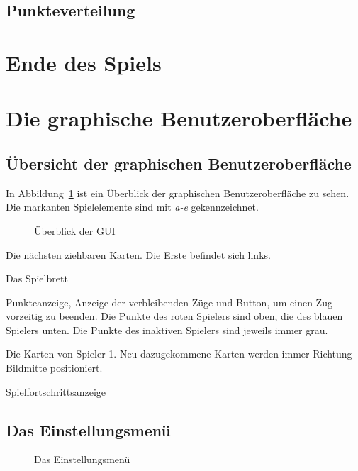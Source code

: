 \documentclass[a4paper, ngerman]{scrartcl}
\begin{document}
	
\subsection{Punkteverteilung}
	
\section{Ende des Spiels}

	
\section{Die graphische Benutzeroberfläche}
\subsection{Übersicht der graphischen Benutzeroberfläche}
	In Abbildung~\ref{fig:GUI} ist ein Überblick der graphischen Benutzeroberfläche
	zu sehen. Die markanten Spielelemente sind mit \emph{a-e} gekennzeichnet.
	
	 \begin{figure}[h!]
		\centering		
		\caption{Überblick der GUI}
		\label{fig:GUI}
	\end{figure}
	
\begin{compactenum}[a)] \item Die nächsten ziehbaren Karten. Die Erste befindet
sich links.
\item Das Spielbrett \item Punkteanzeige, Anzeige der verbleibenden Züge und
Button, um einen Zug vorzeitig zu beenden. Die Punkte des roten Spielers sind
oben, die des blauen Spielers unten. Die Punkte des inaktiven Spielers sind
jeweils immer grau.
\item Die Karten von Spieler 1. Neu dazugekommene Karten werden immer Richtung
Bildmitte positioniert.
\item Spielfortschrittsanzeige
	\end{compactenum}
	
\subsection{Das Einstellungsmenü}
	 \begin{figure}[h]
		\centering
		\caption{Das Einstellungsmenü}
		\label{fig:Configuration}
	\end{figure}
	
\end{document}
